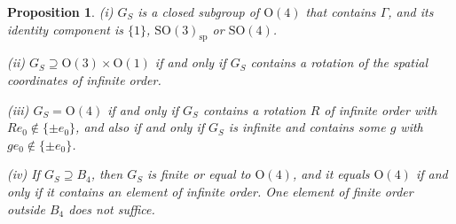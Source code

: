 \documentclass[aps,prd,twocolumn,superscriptaddress,nofootinbib,longbibliography,floatfix,amsmath,amssymb,10pt]{revtex4-2}
\newtheorem{proposition}[theorem]{Proposition}
\theoremstyle{definition}
\theoremstyle{remark}
\newcommand{\SO}{\mathrm{SO}}
\begin{document}
\begin{proposition}\label{prop:rotations}
\textup{(i)} $G_S$ is a closed subgroup of $\mathrm O(4)$ that contains
$\Gamma$, and its identity component is $\{1\}$, $\SO(3)_{\mathrm{sp}}$ or
$\SO(4)$.

\textup{(ii)} $G_S\supseteq\mathrm O(3)\times\mathrm O(1)$ if and only if
$G_S$ contains a rotation of the spatial coordinates of infinite order.

\textup{(iii)} $G_S=\mathrm O(4)$ if and only if $G_S$ contains a rotation
$R$ of infinite order with $Re_0\notin\{\pm e_0\}$, and also if and only if
$G_S$ is infinite and contains some $g$ with $ge_0\notin\{\pm e_0\}$.

\textup{(iv)} If $G_S\supseteq B_4$, then $G_S$ is finite or equal to
$\mathrm O(4)$, and it equals $\mathrm O(4)$ if and only if it contains an
element of infinite order. One element of finite order outside $B_4$ does
not suffice.
\end{proposition}
\end{document}
